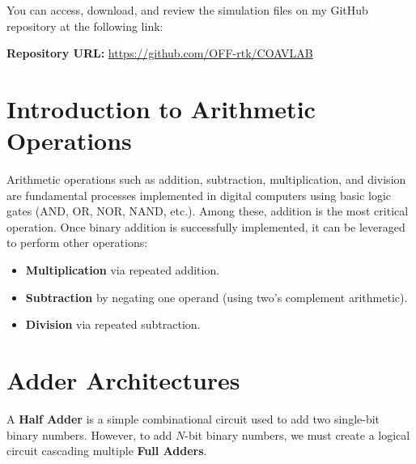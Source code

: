 \documentclass[11pt, a4paper]{article}
\begin{document}
\vspace{0.5em}
\noindent You can access, download, and review the simulation files on my GitHub repository at the following link:\par
\vspace{0.5em}
\noindent\textbf{Repository URL:} \href{https://github.com/OFF-rtk/COAVLAB}{https://github.com/OFF-rtk/COAVLAB}

\vspace{2em}


\maketitle
{}
\vspace{-3em}

\section{Introduction to Arithmetic Operations}
Arithmetic operations such as addition, subtraction, multiplication, and division are fundamental processes implemented in digital computers using basic logic gates (AND, OR, NOR, NAND, etc.). Among these, addition is the most critical operation. Once binary addition is successfully implemented, it can be leveraged to perform other operations:
\begin{itemize}
    \item \textbf{Multiplication} via repeated addition.
    \item \textbf{Subtraction} by negating one operand (using two's complement arithmetic).
    \item \textbf{Division} via repeated subtraction.
\end{itemize}

\section{Adder Architectures}
A \textbf{Half Adder} is a simple combinational circuit used to add two single-bit binary numbers. However, to add $N$-bit binary numbers, we must create a logical circuit cascading multiple \textbf{Full Adders}.
\end{document}
